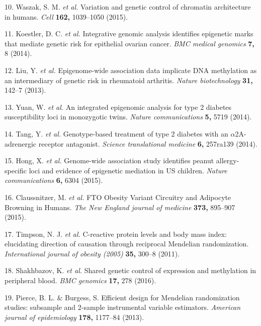 \documentclass[]{article}
\begin{document}
\hypertarget{ref-Waszak2015}{}
10. Waszak, S. M. \emph{et al.} Variation and genetic control of
chromatin architecture in humans. \emph{Cell} \textbf{162,} 1039--1050
(2015).

\hypertarget{ref-Koestler2014}{}
11. Koestler, D. C. \emph{et al.} Integrative genomic analysis
identifies epigenetic marks that mediate genetic risk for epithelial
ovarian cancer. \emph{BMC medical genomics} \textbf{7,} 8 (2014).

\hypertarget{ref-Liu2013}{}
12. Liu, Y. \emph{et al.} Epigenome-wide association data implicate DNA
methylation as an intermediary of genetic risk in rheumatoid arthritis.
\emph{Nature biotechnology} \textbf{31,} 142--7 (2013).

\hypertarget{ref-Yuan2014}{}
13. Yuan, W. \emph{et al.} An integrated epigenomic analysis for type 2
diabetes susceptibility loci in monozygotic twins. \emph{Nature
communications} \textbf{5,} 5719 (2014).

\hypertarget{ref-Tang2014}{}
14. Tang, Y. \emph{et al.} Genotype-based treatment of type 2 diabetes
with an \(\alpha\)2A-adrenergic receptor antagonist. \emph{Science
translational medicine} \textbf{6,} 257ra139 (2014).

\hypertarget{ref-Hong2015}{}
15. Hong, X. \emph{et al.} Genome-wide association study identifies
peanut allergy-specific loci and evidence of epigenetic mediation in US
children. \emph{Nature communications} \textbf{6,} 6304 (2015).

\hypertarget{ref-Claussnitzer2015}{}
16. Claussnitzer, M. \emph{et al.} FTO Obesity Variant Circuitry and
Adipocyte Browning in Humans. \emph{The New England journal of medicine}
\textbf{373,} 895--907 (2015).

\hypertarget{ref-Timpson2011}{}
17. Timpson, N. J. \emph{et al.} C-reactive protein levels and body mass
index: elucidating direction of causation through reciprocal Mendelian
randomization. \emph{International journal of obesity (2005)}
\textbf{35,} 300--8 (2011).

\hypertarget{ref-Shakhbazov2016}{}
18. Shakhbazov, K. \emph{et al.} Shared genetic control of expression
and methylation in peripheral blood. \emph{BMC genomics} \textbf{17,}
278 (2016).

\hypertarget{ref-Pierce2013}{}
19. Pierce, B. L. \& Burgess, S. Efficient design for Mendelian
randomization studies: subsample and 2-sample instrumental variable
estimators. \emph{American journal of epidemiology} \textbf{178,}
1177--84 (2013).
\end{document}
